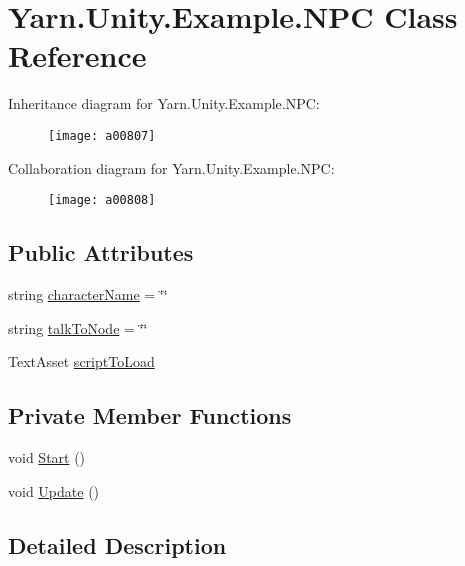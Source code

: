 \hypertarget{a00141}{\section{Yarn.\-Unity.\-Example.\-N\-P\-C Class Reference}
\label{a00141}
}


Inheritance diagram for Yarn.\-Unity.\-Example.\-N\-P\-C\-:
\nopagebreak
\begin{figure}[H]
\begin{center}
\leavevmode
\texttt{[image: a00807]}
\end{center}
\end{figure}


Collaboration diagram for Yarn.\-Unity.\-Example.\-N\-P\-C\-:
\nopagebreak
\begin{figure}[H]
\begin{center}
\leavevmode
\texttt{[image: a00808]}
\end{center}
\end{figure}
\subsection*{Public Attributes}
\begin{DoxyCompactItemize}
\item 
string \hyperlink{a00141_a418ea7095bd8201559ed392f07905ca3}{character\-Name} = \char`\"{}\char`\"{}
\item 
string \hyperlink{a00141_a64f4f1fb66b2046a674e3ebf3b9fdb56}{talk\-To\-Node} = \char`\"{}\char`\"{}
\item 
Text\-Asset \hyperlink{a00141_a63145fb6ddf357e604d71bac04ca8a60}{script\-To\-Load}
\end{DoxyCompactItemize}
\subsection*{Private Member Functions}
\begin{DoxyCompactItemize}
\item 
void \hyperlink{a00141_a0bf37075312ea87c2e329cc363a328a6}{Start} ()
\item 
void \hyperlink{a00141_ab1bea5afabd1c2e1e991063b1579d062}{Update} ()
\end{DoxyCompactItemize}


\subsection{Detailed Description}


